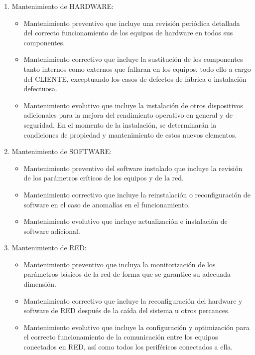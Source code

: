 \documentclass['12pt',spanish,a4paper,]{article}
\begin{document}
\begin{enumerate}
\def\labelenumi{\alph{enumi})}
\item
  Mantenimiento de HARDWARE:

  \begin{itemize}
  \itemsep1pt\parskip0pt
  \item
    Mantenimiento preventivo que incluye una revisión periódica
    detallada del correcto funcionamiento de los equipos de hardware en
    todos sus componentes.
  \item
    Mantenimiento correctivo que incluye la sustitución de los
    componentes tanto internos como externos que fallaran en los
    equipos, todo ello a cargo del CLIENTE, exceptuando los casos de
    defectos de fábrica o instalación defectuosa.
  \item
    Mantenimiento evolutivo que incluye la instalación de otros
    dispositivos adicionales para la mejora del rendimiento operativo en
    general y de seguridad. En el momento de la instalación, se
    determinarán la condiciones de propiedad y mantenimiento de estos
    nuevos elementos.
  \end{itemize}
\item
  Mantenimiento de SOFTWARE:

  \begin{itemize}
  \itemsep1pt\parskip0pt
  \item
    Mantenimiento preventivo del software instalado que incluye la
    revisión de los parámetros críticos de los equipos y de la red.
  \item
    Mantenimiento correctivo que incluye la reinstalación o
    reconfiguración de software en el caso de anomalías en el
    funcionamiento.
  \item
    Mantenimiento evolutivo que incluye actualización e instalación de
    software adicional.
  \end{itemize}
\item
  Mantenimiento de RED:

  \begin{itemize}
  \itemsep1pt\parskip0pt
  \item
    Mantenimiento preventivo que incluya la monitorización de los
    parámetros básicos de la red de forma que se garantice su adecuada
    dimensión.
  \item
    Mantenimiento correctivo que incluye la reconfiguración del hardware
    y software de RED después de la caída del sistema u otros percances.
  \item
    Mantenimiento evolutivo que incluye la configuración y optimización
    para el correcto funcionamiento de la comunicación entre los equipos
    conectados en RED, así como todos los periféricos conectados a ella.
  \end{itemize}
\end{enumerate}
\end{document}
